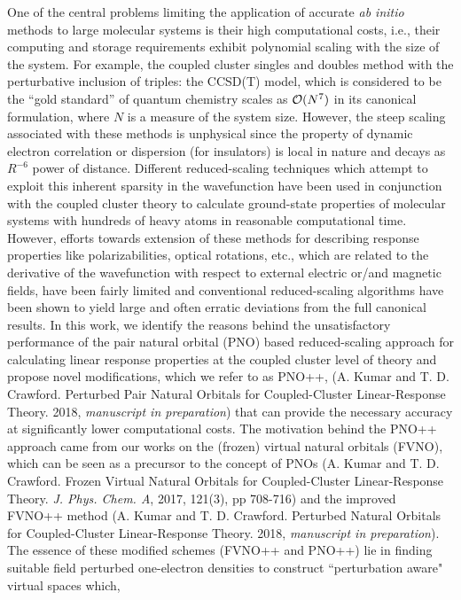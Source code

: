 \documentclass[12pt]{report}
\begin{document}
One of the central problems limiting the application of accurate {\em ab
initio} methods to large molecular systems is their high computational costs,
i.e., their computing and storage requirements exhibit polynomial scaling with
the size of the system. For example, the coupled cluster singles and doubles 
method with the perturbative inclusion of triples: the CCSD(T) model, 
which is considered to be the ``gold standard'' of quantum chemistry scales as 
${\cal O}(N^7)$ in its canonical formulation, where $N$ is a measure of the 
system size. However, the steep scaling associated with these methods is 
unphysical since the property of dynamic electron correlation or dispersion 
(for insulators) is local in nature and decays as $R^{-6}$ power of distance. 
Different reduced-scaling techniques which attempt to exploit this inherent 
sparsity in the wavefunction have been used in conjunction with the coupled cluster 
theory to calculate ground-state properties of molecular systems with
hundreds of heavy atoms in reasonable computational time. However, efforts towards
extension of these methods for describing response properties like polarizabilities, optical rotations, 
etc., which are related to the derivative of the wavefunction with respect to external electric or/and magnetic fields,
have been fairly limited and conventional 
reduced-scaling algorithms have been shown to yield large and often erratic deviations from 
the full canonical results. In this work, we identify the reasons behind 
the unsatisfactory performance of the pair natural orbital (PNO) based reduced-scaling 
approach for calculating linear response properties at the coupled cluster level of theory 
and propose novel modifications, which we refer to as PNO++, (A. Kumar and T. D. Crawford. Perturbed Pair 
Natural Orbitals for Coupled-Cluster Linear-Response Theory. 2018, {\em manuscript in preparation}) 
that can provide the necessary accuracy at significantly lower computational costs. The motivation 
behind the PNO++ approach came from our works on the (frozen) virtual natural orbitals (FVNO), which can 
be seen as a precursor to the concept of PNOs (A. Kumar and T. D. Crawford. Frozen Virtual Natural Orbitals for 
Coupled-Cluster Linear-Response Theory. {\em J. Phys. Chem. A}, 2017, 121(3), pp 708-716) and the improved 
FVNO++ method (A. Kumar and T. D. Crawford. Perturbed Natural Orbitals for Coupled-Cluster Linear-Response 
Theory. 2018, {\em manuscript in preparation}). The essence of these modified schemes (FVNO++ and PNO++) lie in finding suitable 
field perturbed one-electron densities to construct ``perturbation aware" virtual spaces which,
\end{document}
